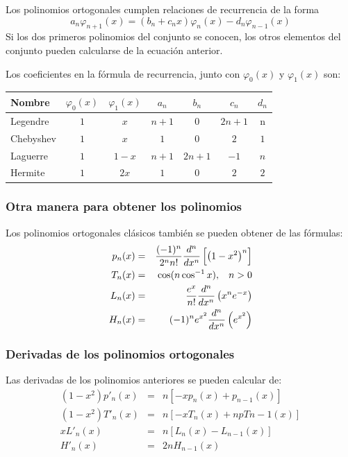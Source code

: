 \begin{frame}
Los polinomios ortogonales cumplen relaciones de recurrencia de la forma
\[ a_{n} \varphi_{n+1} (x) = (b_{n} + c_{n} x) \varphi_{n} (x) - d_{n} \varphi_{n-1} (x)  \]
Si los dos primeros polinomios del conjunto se conocen, los otros elementos del conjunto pueden calcularse de la ecuación anterior. 
\end{frame}
\begin{frame}
Los coeficientes en la fórmula de recurrencia, junto con $\varphi_{0}(x)$ y $\varphi_{1}(x)$ son:
\fontsize{12}{12}\selectfont
\begin{tabular}{| l | c | c | c | c | c | c |}
\hline
Nombre & $\varphi_{0}(x)$ & $\varphi_{1}(x)$ & $a_{n}$ & $b_{n}$ & $c_{n}$ & $d_{n}$ \\ \hline
Legendre & $1$ & $x$ & $n+1$ & $0$ & $2n+1$ & n \\
Chebyshev & $1$ & $x$ & $1$ & $0$ & $2$ & $1$ \\
Laguerre & $1$ & $1-x$ & $n+1$ & $2n+1$ & $-1$ & $n$ \\
Hermite & $1$ & $2x$ & $1$ & $0$ & $2$ & $2$ \\ \hline
\end{tabular}
\end{frame}
\begin{frame}
\frametitle{Otra manera para obtener los polinomios}
Los polinomios ortogonales clásicos también se pueden obtener de las fórmulas:
\begin{eqnarray*}
p_{n}(x) &=& \dfrac{(-1)^{n}}{2^{n}n!} \dfrac{d^{n}}{dx^{n}} \left[ \left( 1-x^{2} \right)^{n} \right] \\
T_{n}(x) &=& \cos(n\cos^{-1}x), \hspace{0.3cm} n>0 \\
L_{n}(x) &=& \dfrac{e^{x}}{n!} \dfrac{d^{n}}{dx^{n}} \left( x^{n} e^{-x} \right) \\
H_{n}(x) &=& (-1)^{n} e^{x^{2}} \dfrac{d^{n}}{dx^{n}} \left(e^{x^{2}} \right)
\end{eqnarray*}
\end{frame}
\begin{frame}
\frametitle{Derivadas de los polinomios ortogonales}
Las derivadas de los polinomios anteriores se pueden calcular de:
\begin{eqnarray*}
(1-x^{2}) p'_{n}(x) &=& n[-x p_{n}(x) + p_{n-1}(x) ] \\
(1-x^{2}) T'_{n}(x) &=& n[-x T_{n}(x) + n p T{n-1}(x) ] \\
x L'_{n} (x) &=& n [ L_{n}(x) - L_{n-1}(x) ] \\
H'_{n}(x) &=& 2 n H_{n-1}(x)
\end{eqnarray*}
\end{frame}
